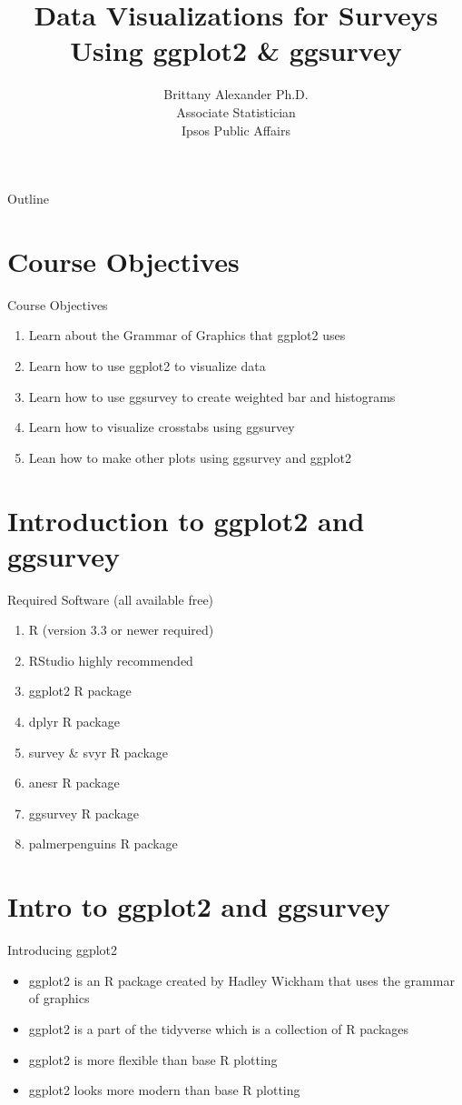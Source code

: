 \documentclass{beamer}\usepackage[]{graphicx}\usepackage[]{color}
\title{Data Visualizations for Surveys Using ggplot2 \& ggsurvey}
\author{Brittany Alexander Ph.D. \\
Associate Statistician \\
Ipsos Public Affairs}
\begin{document}
\begin{frame}
\titlepage
\end{frame}
\begin{frame}{Outline}
\tableofcontents
\end{frame}
\section{Course Objectives}
\begin{frame}{Course Objectives}
\begin{enumerate}
\item Learn about the Grammar of Graphics that ggplot2 uses
\item Learn how to use ggplot2 to visualize data
\item Learn how to use ggsurvey to create weighted bar and histograms
\item Learn how to visualize crosstabs using ggsurvey
\item Lean how to make other plots using ggsurvey and ggplot2
\end{enumerate}
\end{frame}


\section{Introduction to ggplot2 and ggsurvey}
\begin{frame}{Required Software (all available free)}
\begin{enumerate}
\item R (version 3.3 or newer required)
\item RStudio highly recommended
\item ggplot2 R package
\item dplyr R package
\item survey \& svyr R package
\item anesr R package
\item ggsurvey R package
\item palmerpenguins R package
\end{enumerate}
\end{frame}

\section{Intro to ggplot2 and ggsurvey}
\begin{frame}{Introducing ggplot2}
\begin{itemize}
\item ggplot2 is an R package created by Hadley Wickham that uses the grammar of graphics
\item ggplot2 is a part of the tidyverse which is a collection of R packages
\item ggplot2 is more flexible than base R plotting
\item ggplot2 looks more modern than base R plotting
\end{itemize}

\end{frame}
\end{document}
